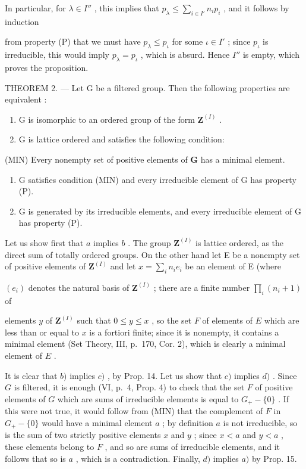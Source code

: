 In particular, for \(\lambda \in I''\) , this implies that \(p_{\lambda} \leqslant \sum_{i \in I'} n_i p_i\) , and it follows by induction

from property (P) that we must have \(p_{\lambda} \leqslant p_{\iota}\) for some \(\iota \in I'\) ; since \(p_{\iota}\) is irreducible, this would imply \(p_{\lambda} = p_{\iota}\) , which is absurd. Hence \(I''\) is empty, which proves the proposition.

THEOREM 2. --- Let G be a filtered group. Then the following properties are equivalent :

\begin{enumerate}
\def\labelenumi{\alph{enumi})}
\item
  G is isomorphic to an ordered group of the form \(\mathbf{Z}^{(I)}\) .
\item
  G is lattice ordered and satisfies the following condition:
\end{enumerate}

(MIN) Every nonempty set of positive elements of \(\mathbf{G}\) has a minimal element.

\begin{enumerate}
\def\labelenumi{\alph{enumi})}
\setcounter{enumi}{2}
\item
  G satisfies condition (MIN) and every irreducible element of G has property (P).
\item
  G is generated by its irreducible elements, and every irreducible element of G has property (P).
\end{enumerate}

Let us show first that \(a\) implies \(b\) . The group \(\mathbf{Z}^{(I)}\) is lattice ordered, as the direct sum of totally ordered groups. On the other hand let E be a nonempty set of positive elements of \(\mathbf{Z}^{(I)}\) and let \(x = \sum_{i} n_i e_i\) be an element of E (where

\((e_{i})\) denotes the natural basis of \(\mathbf{Z}^{(I)}\) ; there are a finite number \(\prod_{i}(n_{i} + 1)\) of

elements \(y\) of \(\mathbf{Z}^{(I)}\) such that \(0 \leqslant y \leqslant x\) , so the set \(F\) of elements of \(E\) which are less than or equal to \(x\) is a fortiori finite; since it is nonempty, it contains a minimal element (Set Theory, III, p.~170, Cor. 2), which is clearly a minimal element of \(E\) .

It is clear that \(b)\) implies \(c)\) , by Prop. 14. Let us show that \(c)\) implies \(d)\) . Since \(G\) is filtered, it is enough (VI, p.~4, Prop. 4) to check that the set \(F\) of positive elements of \(G\) which are sums of irreducible elements is equal to \(G_{+} - \{0\}\) . If this were not true, it would follow from (MIN) that the complement of \(F\) in \(G_{+} - \{0\}\) would have a minimal element \(a\) ; by definition \(a\) is not irreducible, so is the sum of two strictly positive elements \(x\) and \(y\) ; since \(x < a\) and \(y < a\) , these elements belong to \(F\) , and so are sums of irreducible elements, and it follows that so is \(a\) , which is a contradiction. Finally, \(d)\) implies \(a)\) by Prop. 15.

